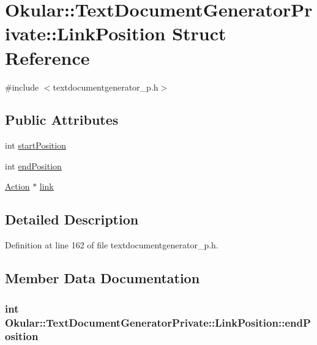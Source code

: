 \hypertarget{structOkular_1_1TextDocumentGeneratorPrivate_1_1LinkPosition}{\section{Okular\+:\+:Text\+Document\+Generator\+Private\+:\+:Link\+Position Struct Reference}
\label{structOkular_1_1TextDocumentGeneratorPrivate_1_1LinkPosition}
}


{\ttfamily \#include $<$textdocumentgenerator\+\_\+p.\+h$>$}

\subsection*{Public Attributes}
\begin{DoxyCompactItemize}
\item 
int \hyperlink{structOkular_1_1TextDocumentGeneratorPrivate_1_1LinkPosition_ab4fe30fdf9d7e281f30387190411a086}{start\+Position}
\item 
int \hyperlink{structOkular_1_1TextDocumentGeneratorPrivate_1_1LinkPosition_a04f1ecb7c65ac0840978aa5da53adf4d}{end\+Position}
\item 
\hyperlink{classOkular_1_1Action}{Action} $\ast$ \hyperlink{structOkular_1_1TextDocumentGeneratorPrivate_1_1LinkPosition_a28f22efca06cf1df74ae313225771b63}{link}
\end{DoxyCompactItemize}


\subsection{Detailed Description}


Definition at line 162 of file textdocumentgenerator\+\_\+p.\+h.



\subsection{Member Data Documentation}
\hypertarget{structOkular_1_1TextDocumentGeneratorPrivate_1_1LinkPosition_a04f1ecb7c65ac0840978aa5da53adf4d}{
\subsubsection[{end\+Position}]{\setlength{\rightskip}{0pt plus 5cm}int Okular\+::\+Text\+Document\+Generator\+Private\+::\+Link\+Position\+::end\+Position}}\label{structOkular_1_1TextDocumentGeneratorPrivate_1_1LinkPosition_a04f1ecb7c65ac0840978aa5da53adf4d}


